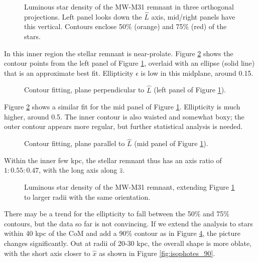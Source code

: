 \documentclass[twocolumn]{aastex63}
\begin{document}
\begin{figure}[htb!]
	\caption{Luminous star density of the MW-M31 remnant in three orthogonal projections. Left panel looks down the $\hat{L}$ axis, mid/right panels have this vertical. Contours enclose 50\% (orange) and 75\% (red) of the stars.
		\label{fig:rem_shape_10}}
\end{figure}

In this inner region the stellar remnant is near-prolate. Figure \ref{fig:isophote_xy} shows the contour points from the left panel of Figure \ref{fig:rem_shape_10}, overlaid with an ellipse (solid line) that is an approximate best fit. Ellipticity $\epsilon$ is low in this midplane, around 0.15.

\begin{figure}[htb!]
	\caption{Contour fitting, plane perpendicular to $\hat{L}$ (left panel of Figure \ref{fig:rem_shape_10}).
		\label{fig:isophote_xy}}
\end{figure}

Figure \ref{fig:isophote_xy} shows a similar fit for the mid panel of Figure \ref{fig:rem_shape_10}. Ellipticity is much higher, around 0.5. The inner contour is also waisted and somewhat boxy; the outer contour appears more regular, but further statistical analysis is needed.

\begin{figure}[htb!]
	\caption{Contour fitting, plane parallel to $\hat{L}$ (mid panel of Figure \ref{fig:rem_shape_10}).
		\label{fig:isophote_xz}}
\end{figure}

Within the inner few kpc, the stellar remnant thus has an axis ratio of $1:0.55:0.47$, with the long axis along $\hat{z}$. 

\begin{figure}[htb!]
	\caption{Luminous star density of the MW-M31 remnant, extending Figure \ref{fig:rem_shape_10} to larger radii with the same orientation.
		\label{fig:rem_shape_40}}
\end{figure}

There may be a trend for the ellipticity to fall between the 50\% and 75\% contours, but the data so far is not convincing. If we extend the analysis to stars within 40 kpc of the CoM and add a 90\% contour as in Figure \ref{fig:rem_shape_40}, the picture changes significantly. Out at radii of 20-30 kpc, the overall shape is more oblate, with the short axis closer to $\hat{x}$ as shown in Figure \ref{fig:isophotes_90}. 
\end{document}
